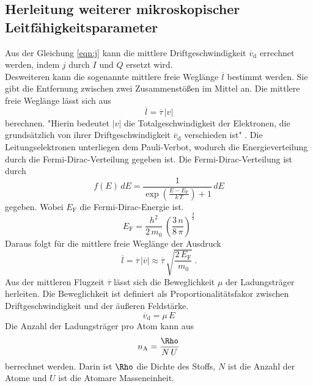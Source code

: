 \subsection{Herleitung weiterer mikroskopischer Leitfähigkeitsparameter}
Aus der Gleichung \eqref{eqn:j} kann die mittlere Driftgeschwindigkeit $\overline{v}_\text{d}$ errechnet werden, indem $j$ durch $I$ und $Q$ ersetzt wird. \\
Desweiteren kann die sogenannte mittlere freie Weglänge $\overline{l}$ bestimmt werden. Sie gibt die Entfernung zwischen zwei Zusammenstößen im Mittel an. Die mittlere freie Weglänge lässt sich aus
\begin{equation}
	\overline{l} = \overline{\tau}\,|v|
	\label{eqn:l}
\end{equation}
berechnen. "Hierin bedeutet $|v|$ die Totalgeschwindigkeit der Elektronen, die grundsätzlich von ihrer Driftgeschwindigkeit $\overline{v}_\text{d}$ verschieden ist" \cite[6]{sample}. Die Leitungselektronen unterliegen dem Pauli-Verbot, wodurch die Energieverteilung durch die Fermi-Dirac-Verteilung gegeben ist. Die Fermi-Dirac-Verteilung ist durch
\begin{equation}
	f(E)\,dE = \frac{1}{\exp\left(\frac{E - E_\text{F}}{k\,T}\right) + 1}\,dE
\end{equation}
gegeben. Wobei $E_\text{F}$ die Fermi-Dirac-Energie ist.
\begin{equation}
	E_\text{F} = \frac{h^2}{2\,m_0}\,\left(\frac{3\,n}{8\,\pi} \right)^{\frac{3}{2}}
\end{equation}
Daraus folgt für die mittlere freie Weglänge der Ausdruck
\begin{equation}
	\overline{l} = \overline{\tau}\,|\overline{v}| \approx \overline{\tau}\,\sqrt{\frac{2\,E_\text{F}}{m_0}} \ .
\end{equation}
Aus der mittleren Flugzeit $\overline{\tau}$ lässt sich die Beweglichkeit $\mu$ der Ladungsträger herleiten. Die Beweglichkeit ist definiert als Proportionalitätsfakor zwischen Driftgeschwindigkeit und der äußeren Feldstärke.
\begin{equation}
	\overline{v}_\text{d} = \mu\,E
	\label{eqn:Beweglichkeit}
\end{equation}
Die Anzahl der Ladungsträger pro Atom kann aus
\begin{equation}
	n_\text{A} = \frac{\Rho}{N\,U}
	\label{eqn:anzahl}
\end{equation}
berrechnet werden. Darin ist $\Rho$ die Dichte des Stoffs, $N$ ist die Anzahl der Atome und $U$ ist die Atomare Masseneinheit. 


